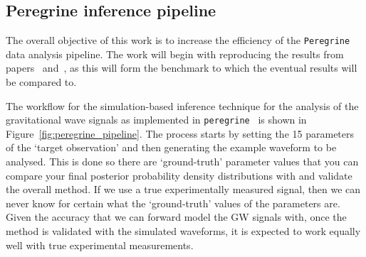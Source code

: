 \subsection{Peregrine inference pipeline}

The overall objective of this work is to increase the efficiency of the \texttt{Peregrine} data analysis pipeline. The work will begin with reproducing the results from papers~\cite{bhardwaj2023peregrine} and~\cite{alvey2023things}, as this will form the benchmark to which the eventual results will be compared to.

The workflow for the simulation-based inference technique for the analysis of the gravitational wave signals as implemented in \texttt{peregrine}~\cite{bhardwaj2023peregrine} is shown in Figure~\ref{fig:peregrine_pipeline}. The process starts by setting the 15 parameters of the `target observation' and then generating the example waveform to be analysed. This is done so there are `ground-truth' parameter values that you can compare your final posterior probability density distributions with and validate the overall method. If we use a true experimentally measured signal, then we can never know for certain what the `ground-truth' values of the parameters are. Given the accuracy that we can forward model the GW signals with, once the method is validated with the simulated waveforms, it is expected to work equally well with true experimental measurements.

